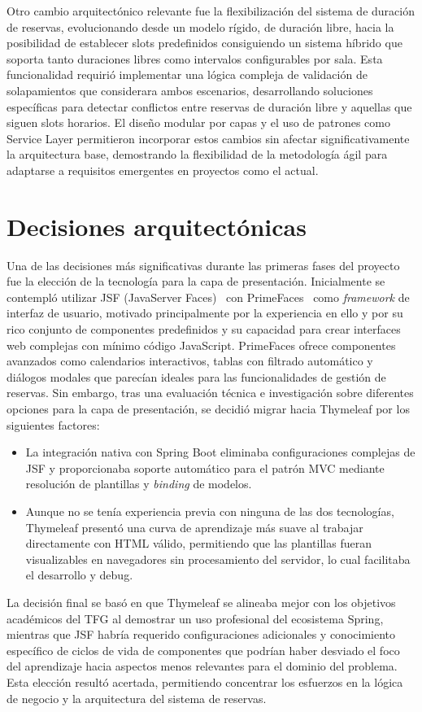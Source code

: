 Otro cambio arquitectónico relevante fue la flexibilización del sistema de duración de reservas, evolucionando desde un modelo rígido, de duración libre, hacia la posibilidad de establecer slots predefinidos consiguiendo un sistema híbrido que soporta tanto duraciones libres como intervalos configurables por sala. Esta funcionalidad requirió implementar una lógica compleja de validación de solapamientos que considerara ambos escenarios, desarrollando soluciones específicas para detectar conflictos entre reservas de duración libre y aquellas que siguen slots horarios. El diseño modular por capas y el uso de patrones como Service Layer permitieron incorporar estos cambios sin afectar significativamente la arquitectura base, demostrando la flexibilidad de la metodología ágil para adaptarse a requisitos emergentes en proyectos como el actual.\\

\section{Decisiones arquitectónicas}\label{decisiones-arquitectonicas}
Una de las decisiones más significativas durante las primeras fases del proyecto fue la elección de la tecnología para la capa de presentación. Inicialmente se contempló utilizar JSF (JavaServer Faces)~\cite{jsf} con PrimeFaces~\cite{primefaces} como \emph{framework} de interfaz de usuario, motivado principalmente por la experiencia en ello y por su rico conjunto de componentes predefinidos y su capacidad para crear interfaces web complejas con mínimo código JavaScript. PrimeFaces ofrece componentes avanzados como calendarios interactivos, tablas con filtrado automático y diálogos modales que parecían ideales para las funcionalidades de gestión de reservas.
Sin embargo, tras una evaluación técnica e investigación sobre diferentes opciones para la capa de presentación, se decidió migrar hacia Thymeleaf por los siguientes factores:
\begin{itemize}
\tightlist
\item
La integración nativa con Spring Boot eliminaba configuraciones complejas de JSF y proporcionaba soporte automático para el patrón MVC mediante resolución de plantillas y \emph{binding} de modelos.
\item
Aunque no se tenía experiencia previa con ninguna de las dos tecnologías, Thymeleaf presentó una curva de aprendizaje más suave al trabajar directamente con HTML válido, permitiendo que las plantillas fueran visualizables en navegadores sin procesamiento del servidor, lo cual facilitaba el desarrollo y debug.
\end{itemize}
La decisión final se basó en que Thymeleaf se alineaba mejor con los objetivos académicos del TFG al demostrar un uso profesional del ecosistema Spring, mientras que JSF habría requerido configuraciones adicionales y conocimiento específico de ciclos de vida de componentes que podrían haber desviado el foco del aprendizaje hacia aspectos menos relevantes para el dominio del problema. Esta elección resultó acertada, permitiendo concentrar los esfuerzos en la lógica de negocio y la arquitectura del sistema de reservas.\\

